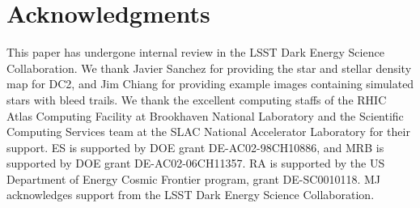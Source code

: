 \documentclass[twocolumn,twocolappendix,astrosym]{openjournal}
\begin{document}
\section*{Acknowledgments}

This paper has undergone internal review in the LSST Dark Energy Science
Collaboration. %
We thank Javier Sanchez for providing the star and stellar density map for DC2,
and Jim Chiang for providing example images containing simulated stars
with bleed trails.
We thank the excellent computing staffs of the RHIC Atlas Computing Facility at
Brookhaven National Laboratory and the Scientific Computing Services team at
the SLAC National Accelerator Laboratory for their support.
ES is supported by DOE grant DE-AC02-98CH10886, and MRB is supported by DOE
grant DE-AC02-06CH11357. RA is supported by the US Department of Energy Cosmic
Frontier program, grant DE-SC0010118.  MJ acknowledges support from the LSST
Dark Energy Science Collaboration.



%
%
%
%


\end{document}
